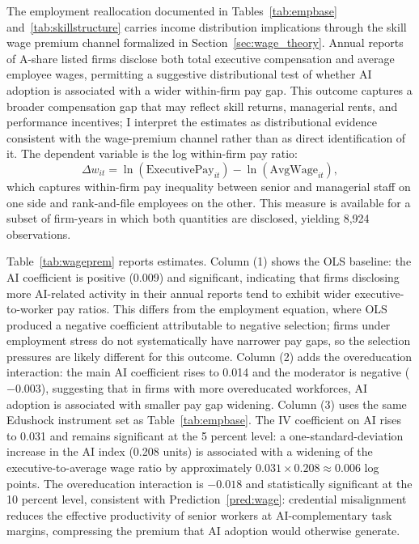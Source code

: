 \documentclass[12pt,a4paper]{article}
\theoremstyle{predstyle}
\theoremstyle{plain}
\begin{document}
The employment reallocation documented in Tables~\ref{tab:empbase} and~\ref{tab:skillstructure} carries income distribution implications through the skill wage premium channel formalized in Section~\ref{sec:wage_theory}. Annual reports of A-share listed firms disclose both total executive compensation and average employee wages, permitting a suggestive distributional test of whether AI adoption is associated with a wider within-firm pay gap. This outcome captures a broader compensation gap that may reflect skill returns, managerial rents, and performance incentives; I interpret the estimates as distributional evidence consistent with the wage-premium channel rather than as direct identification of it. The dependent variable is the log within-firm pay ratio:
\[
\Delta w_{it} = \ln(\text{ExecutivePay}_{it}) - \ln(\text{AvgWage}_{it}),
\]
which captures within-firm pay inequality between senior and managerial staff on one side and rank-and-file employees on the other. This measure is available for a subset of firm-years in which both quantities are disclosed, yielding 8,924 observations.

Table~\ref{tab:wageprem} reports estimates. Column (1) shows the OLS baseline: the AI coefficient is positive (0.009) and significant, indicating that firms disclosing more AI-related activity in their annual reports tend to exhibit wider executive-to-worker pay ratios. This differs from the employment equation, where OLS produced a negative coefficient attributable to negative selection; firms under employment stress do not systematically have narrower pay gaps, so the selection pressures are likely different for this outcome. Column (2) adds the overeducation interaction: the main AI coefficient rises to 0.014 and the moderator is negative ($-0.003$), suggesting that in firms with more overeducated workforces, AI adoption is associated with smaller pay gap widening. Column (3) uses the same Edushock instrument set as Table~\ref{tab:empbase}. The IV coefficient on AI rises to 0.031 and remains significant at the 5 percent level: a one-standard-deviation increase in the AI index (0.208 units) is associated with a widening of the executive-to-average wage ratio by approximately $0.031 \times 0.208 \approx 0.006$ log points. The overeducation interaction is $-0.018$ and statistically significant at the 10 percent level, consistent with Prediction~\ref{pred:wage}: credential misalignment reduces the effective productivity of senior workers at AI-complementary task margins, compressing the premium that AI adoption would otherwise generate.
\end{document}
